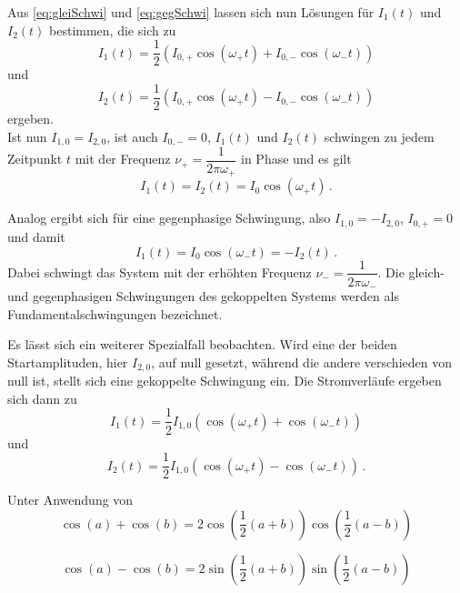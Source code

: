 Aus \eqref{eq:gleiSchwi} und \eqref{eq:gegSchwi} lassen sich nun Lösungen für $I_1(t)$ und $I_2(t)$ bestimmen, die sich zu
\begin{equation}
    I_1(t) = \dfrac{1}{2}(I_{0,+}\cos(ω_+ t) + I_{0,-}\cos(ω_- t))
\end{equation}
und
\begin{equation}
    I_2(t) = \dfrac{1}{2}(I_{0,+}\cos(ω_+ t) - I_{0,-}\cos(ω_- t))
\end{equation}
ergeben. \\

Ist nun $I_{1,0} = I_{2,0}$, ist auch $I_{0,-} = 0$, $I_1(t)$ und $I_2(t)$ schwingen zu jedem Zeitpunkt $t$ mit der Frequenz $ν_+ = \dfrac{1}{2πω_+}$ in Phase und es gilt
\begin{equation*}
     I_1(t) = I_2(t) = I_0 \cos(ω_+ t)\,.
\end{equation*}

Analog ergibt sich für eine gegenphasige Schwingung, also $I_{1,0} = -I_{2,0}$, $I_{0,+}=0$ und damit
\begin{equation*}
    I_1(t) = I_0 \cos(ω_- t) = -I_2(t)\,.
\end{equation*}
Dabei schwingt das System mit der erhöhten Frequenz $ν_- = \dfrac{1}{2πω_-}$. Die gleich- und gegenphasigen Schwingungen des gekoppelten Systems werden als Fundamentalschwingungen bezeichnet.

Es lässt sich ein weiterer Spezialfall beobachten. Wird eine der beiden Startamplituden, hier $I_{2,0}$, auf null gesetzt, während die andere verschieden von null ist, stellt sich eine gekoppelte Schwingung ein.
Die Stromverläufe ergeben sich dann zu
\begin{equation}
    I_1(t) = \dfrac{1}{2} I_{1,0}(\cos(ω_+ t) + \cos(ω_- t))
    \label{eq:gekoSchwi1}
\end{equation}
und
\begin{equation}
    I_2(t) = \dfrac{1}{2} I_{1,0}(\cos(ω_+ t) - \cos(ω_- t))\,.
    \label{eq:gekoSchwi2}
\end{equation}

Unter Anwendung von
\begin{equation*}
    \cos(a) + \cos(b) = 2 \cos(\dfrac{1}{2}(a+b)) \cos(\dfrac{1}{2}(a-b))
\end{equation*} 

\begin{equation*}
    \cos(a) - \cos(b) = 2 \sin(\dfrac{1}{2}(a+b)) \sin(\dfrac{1}{2}(a-b))
\end{equation*} 

